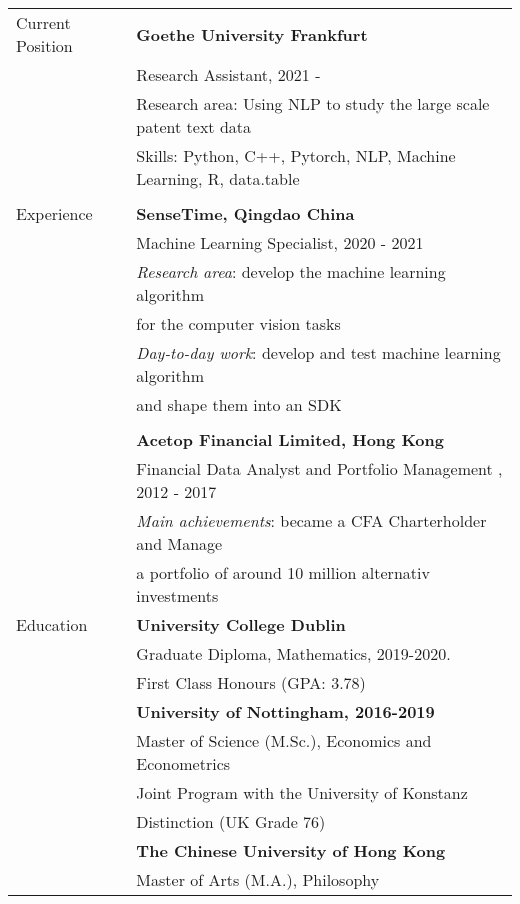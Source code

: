 \documentclass[letterpaper,11pt,oneside]{article}
\begin{document}
\noindent \begin{tabular}{@{} l l}

\Large{Current Position}    & \textbf{Goethe University Frankfurt} \\
     & Research Assistant, 2021 - \\
     & Research area: Using NLP to study the large scale patent text data \\
     & Skills: Python, C++, Pytorch, NLP, Machine Learning, R, data.table \\
        & \\
\Large{Experience} 
    & \textbf{SenseTime, Qingdao China} \\ 
    & Machine Learning Specialist, 2020 - 2021 \\
    & \textit{Research area}: develop the machine learning algorithm \\
    &        \hspace{1in}        for the computer vision tasks \\
    & \textit{Day-to-day work}: develop and test machine learning algorithm \\
    & \hspace{1.2in} and shape them into an SDK\\
    & \\ 
    & \textbf{Acetop Financial Limited, Hong Kong} \\
    & Financial Data Analyst and Portfolio Management , 2012 - 2017 \\
    & \textit{Main achievements}: became a CFA Charterholder and Manage \\
    & \hspace{1.3in} a portfolio of around 10 million alternativ investments  \\
 \Large{Education}    & \textbf{University College Dublin} \\
     & Graduate Diploma, Mathematics, 2019-2020. \\
     & First Class Honours (GPA: 3.78) \\ 
     & \textbf{University of Nottingham, 2016-2019} \\
     & Master of Science (M.Sc.), Economics and Econometrics \\
     & Joint Program with the University of Konstanz \\
     & Distinction (UK Grade 76) \\ 
     & \textbf{The Chinese University of Hong Kong} \\
     & Master of Arts (M.A.), Philosophy \\

\end{tabular}
\end{document}
